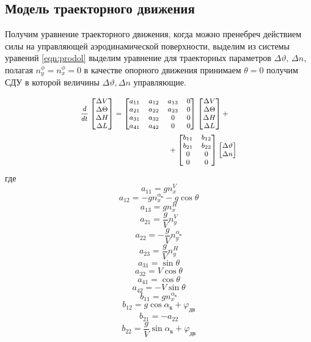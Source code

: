 \documentclass{article}
\begin{document}
\subsection{Модель траекторного движения}
Получим уравнение траекторного движения, когда можно пренебреч действием силы на управляющей аэродинамической поверхности, выделим из системы уравений \eqref{eqn:prodol} выделим уравнение для траекторных параметров $\Delta \vartheta, \, \Delta n$, полагая $n_y^\phi = n_x^\phi = 0$ в качестве опорного движения принимаем $\theta=0$ получим СДУ в которой величины $\Delta \vartheta, \Delta n$ управляющие.


\begin{equation}
\medmath{
  \begin{multlined}
  \frac{d}{dt}
  \begin{bmatrix}
  \Delta V\\
  \Delta \Theta\\
  \Delta H\\
  \Delta L
  \end{bmatrix}
  =
  \begin{bmatrix}
  a_{11} & a_{12} & a_{13} & 0 \\
  a_{21} & a_{22} & a_{23} & 0 \\
  a_{31} & a_{32} & 0 & 0 \\
  a_{41} & a_{42} & 0 & 0 \\
  \end{bmatrix}
  \begin{bmatrix}
  \Delta V\\
  \Delta \Theta\\
  \Delta H\\
  \Delta L
  \end{bmatrix}
  + \\ 
  +
  \begin{bmatrix}
  b_{11} & b_{12}\\
  b_{21} & b_{22} \\
  0 & 0 \\
  0 & 0 \\
  \end{bmatrix}
  \begin{bmatrix}
  \Delta \vartheta\\
  \Delta n\\
  \end{bmatrix}
\end{multlined}
}
\end{equation}
где 
\[
a_{11} = g n_x^V 
\]
\[
a_{12} = -g n_x^{\alpha_к} - g \cos{\theta}
\]
\[
a_{13} = g n_x^H
\]
\[
a_{21} = \frac{g}{V} n_y ^V 
\]
\[
a_{22} = -\frac{g}{V} n_y^{\alpha_к}
\]
\[
a_{23} = \frac{g}{V} n_y^H
\]
\[
a_{31} = \sin{\theta}
\]
\[
a_{32} = V \cos{\theta}
\]
\[
a_{41} = \cos{\theta} 
\]
\[
a_{42} = -V \sin{\theta}
\]
\[
b_{11} = gn_x^{\alpha_к}
\]
\[
b_{12} = g \cos{\alpha_к + \varphi_{дв}}
\]
\[
b_{21} = -a_{22}
\]
\[
b_{22} = \frac{g}{V} \sin{\alpha_к + \varphi_{дв}}
\]
\end{document}

